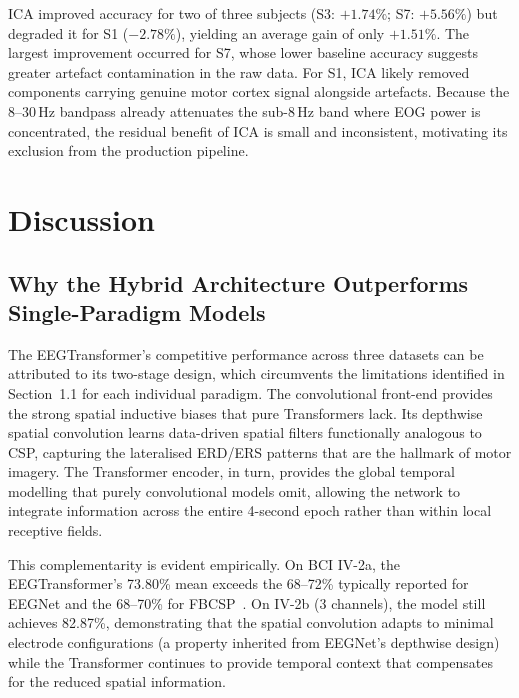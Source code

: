 \documentclass[12pt, a4paper]{article}
\begin{document}
ICA improved accuracy for two of three subjects (S3: $+1.74\%$; S7: $+5.56\%$) but degraded it for S1 ($-2.78\%$), yielding an average gain of only $+1.51\%$. The largest improvement occurred for S7, whose lower baseline accuracy suggests greater artefact contamination in the raw data. For S1, ICA likely removed components carrying genuine motor cortex signal alongside artefacts. Because the 8--30\,Hz bandpass already attenuates the sub-8\,Hz band where EOG power is concentrated, the residual benefit of ICA is small and inconsistent, motivating its exclusion from the production pipeline.

\section{Discussion}

\subsection{Why the Hybrid Architecture Outperforms Single-Paradigm Models}

The EEGTransformer's competitive performance across three datasets can be attributed to its two-stage design, which circumvents the limitations identified in Section~1.1 for each individual paradigm. The convolutional front-end provides the strong spatial inductive biases that pure Transformers lack. Its depthwise spatial convolution learns data-driven spatial filters functionally analogous to CSP, capturing the lateralised ERD/ERS patterns that are the hallmark of motor imagery. The Transformer encoder, in turn, provides the global temporal modelling that purely convolutional models omit, allowing the network to integrate information across the entire 4-second epoch rather than within local receptive fields.

This complementarity is evident empirically. On BCI IV-2a, the EEGTransformer's 73.80\% mean exceeds the 68--72\% typically reported for EEGNet and the 68--70\% for FBCSP~\cite{hameed2025enhancing}. On IV-2b (3 channels), the model still achieves 82.87\%, demonstrating that the spatial convolution adapts to minimal electrode configurations (a property inherited from EEGNet's depthwise design) while the Transformer continues to provide temporal context that compensates for the reduced spatial information.
\end{document}
